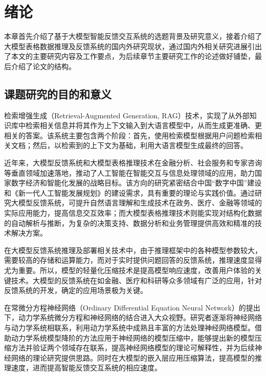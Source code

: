 \chapter{绪论}
\label{cha:intro}

本章首先介绍了基于大模型智能反馈交互系统的选题背景及研究意义，接着介绍了大模型表格数据推理及反馈系统的国内外研究现状，通过国内外相关研究进展引出了本文的主要研究内容及工作要点，为后续章节主要研究工作的论述做好铺垫，最后介绍了论文的结构。
 
\section{课题研究的目的和意义}
检索增强生成（Retrieval-Augmented Generation, RAG）技术，实现了从外部知识库中检索相关信息并将其作为上下文输入到大语言模型中，从而生成更准确、更相关的答案。该系统主要包含两个阶段：首先，使用检索模型根据用户问题检索相关文档；然后，以检索到的上下文为基础，利用大语言模型生成最终的回答。

近年来，大模型反馈系统和大模型表格推理技术在金融分析、社会服务和专家咨询等垂直领域加速落地，推动了人工智能在智能交互与信息处理领域的应用，助力国家数字经济和智能化发展的战略目标。该方向的研究紧密结合中国“数字中国”建设和《新一代人工智能发展规划》的建设需求，具有重要的理论与实践价值。通过研究大模型反馈系统，可提升自然语言理解和生成技术在政务、医疗、金融等领域的实际应用能力，提高信息交互效率；而大模型表格推理技术则能实现对结构化数据的自动解析与推断，为复杂的决策支持、数据分析和业务管理提供高效和精准的技术解决方案。

在大模型反馈系统推理及部署相关技术中，由于推理框架中的各种模型参数较大，需要较高的存储和运算能力，而对于实时提供问题回答的反馈系统，推理速度显得尤为重要。所以，模型的轻量化压缩技术是提高模型响应速度，改善用户体验的关键技术。大模型的反馈系统在如金融、医疗和科研等众多领域有广泛的应用\cite{1024008988.nh,1024532352.nh,1024651093.nh,1024744443.nh,1024917032.nh}，针对反馈系统的开发，确定的应用场景极为关键。

在常微分方程神经网络（Ordinary Differential Equation Neural Network）\cite{chenNeuralOrdinaryDifferential}的提出下，动力学系统微分方程和神经网络的结合进入大众视野。研究者逐渐将神经网络与动力学系统相联系，利用动力学系统中成熟且丰富的方法处理神经网络模型。借助动力学系统模型降阶的方法应用于神经网络的模型压缩中，能够提出新的模型压缩方法并验证两个领域存在联系，提高神经网络模型的理论可解释性，并为后续神经网络的理论研究提供思路。同时在大模型的嵌入层应用压缩算法，提高模型的推理速度，进而提高智能反馈交互系统的相应速度。

